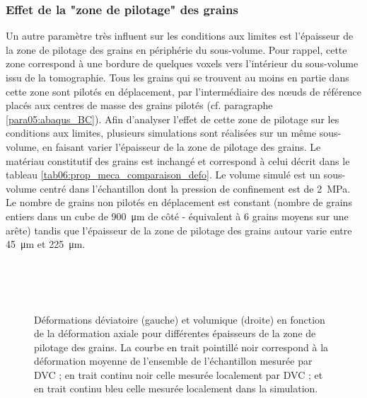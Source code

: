 		\subsubsection{Effet de la "zone de pilotage" des grains}
			Un autre paramètre très influent sur les conditions aux limites est l'épaisseur de la zone de pilotage des grains en périphérie du sous-volume. Pour rappel, cette zone correspond à une bordure de quelques voxels vers l'intérieur du sous-volume issu de la tomographie. Tous les grains qui se trouvent au moins en partie dans cette zone sont pilotés en déplacement, par l'intermédiaire des n\oe{}uds de référence placés aux centres de masse des grains pilotés (cf. paragraphe \ref{para05:abaqus_BC}). Afin d'analyser l'effet de cette zone de pilotage sur les conditions aux limites, plusieurs simulations sont réalisées sur un même sous-volume, en faisant varier l'épaisseur de la zone de pilotage des grains. Le matériau constitutif des grains est inchangé et correspond à celui décrit dans le tableau \ref{tab06:prop_meca_comparaison_defo}. Le volume simulé est un sous-volume centré dans l'échantillon dont la pression de confinement est de \SI{2}{\mega\pascal}. Le nombre de grains non pilotés en déplacement est constant (nombre de grains entiers dans un cube de \SI{900}{\micro\meter} de côté - équivalent à 6 grains moyens sur une arête) tandis que l'épaisseur de la zone de pilotage des grains autour varie entre \SI{45}{\micro\meter} et \SI{225}{\micro\meter}.
			\begin{figure}\centering
				\\
				\\
				\\
				\caption{\label{fig06:comparaison_defo_bordure}Déformations déviatoire (gauche) et volumique (droite) en fonction de la déformation axiale pour différentes épaisseurs de la zone de pilotage des grains. La courbe en trait pointillé noir correspond à la déformation moyenne de l'ensemble de l'échantillon mesurée par DVC ; en trait continu noir celle mesurée localement par DVC ; et en trait continu bleu celle mesurée localement dans la simulation.}
			\end{figure}

